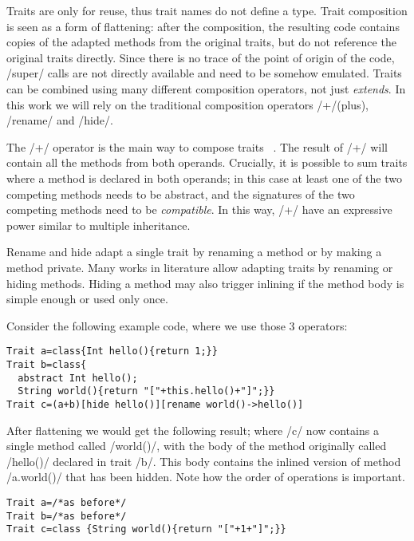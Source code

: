 Traits are only for reuse, thus trait names do not define a type.
Trait composition is seen as a form of flattening: after the composition, the resulting code contains copies of the adapted methods from the original traits, but do not reference the original traits directly. Since there is no trace of
the point of origin of the code, /super/ calls are not 
directly available and need to be somehow emulated.
Traits can be combined using many different composition operators, not just \emph{extends}.
In this work we will rely on the traditional composition operators /+/(plus), /rename/ and /hide/.

The /+/ operator is the main way to compose traits
~\cite{scharli2003traits,LagorioSZ09}.
The result of /+/ will contain all the methods from both operands. 
Crucially, it is possible to sum traits where a method is declared in both operands; in this case at least one of the two competing methods needs to be abstract, and the signatures of the two competing methods need to be \emph{compatible}.
In this way, /+/ have an expressive power similar to multiple inheritance.

Rename and hide adapt a single trait by renaming a method or by making a method private.
Many works in literature allow adapting traits by renaming or hiding methods\cite{servetto2014meta,reppy2007metaprogramming,liquori2008feathertrait}. Hiding a method may also trigger inlining if the method body is simple enough or used only once.


Consider the following example code, where we use those 3 operators:
\begin{lstlisting}
Trait a=class{Int hello(){return 1;}}
Trait b=class{
  abstract Int hello();
  String world(){return "["+this.hello()+"]";}}
Trait c=(a+b)[hide hello()][rename world()->hello()]
\end{lstlisting}
After flattening we would get the following result; where /c/ now contains a single method called
/world()/, with the body of the method originally called /hello()/ declared in trait /b/. This body contains the
inlined version of method /a.world()/ that has been hidden.
Note how the order of operations is important.
\begin{lstlisting}
Trait a=/*as before*/
Trait b=/*as before*/
Trait c=class {String world(){return "["+1+"]";}}
\end{lstlisting}

